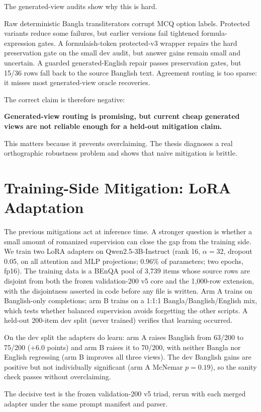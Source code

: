 The generated-view audits show why this is hard.

Raw deterministic Bangla transliterators corrupt MCQ option labels. Protected variants reduce some failures, but earlier versions fail tightened formula-expression gates. A formulaish-token protected-v3 wrapper repairs the hard preservation gate on the small dev audit, but answer gains remain small and uncertain. A guarded generated-English repair passes preservation gates, but 15/36 rows fall back to the source Banglish text. Agreement routing is too sparse: it misses most generated-view oracle recoveries.

The correct claim is therefore negative:

\textbf{Generated-view routing is promising, but current cheap generated views are not reliable enough for a held-out mitigation claim.}

This matters because it prevents overclaiming. The thesis diagnoses a real orthographic robustness problem and shows that naive mitigation is brittle.

\section{Training-Side Mitigation: LoRA Adaptation}

The previous mitigations act at inference time. A stronger question is whether a small amount of romanized supervision can close the gap from the training side. We train two LoRA adapters on Qwen2.5-3B-Instruct (rank 16, $\alpha=32$, dropout 0.05, on all attention and MLP projections; 0.96\% of parameters; two epochs, fp16). The training data is a BEnQA pool of 3{,}739 items whose source rows are disjoint from both the frozen validation-200 v5 core and the 1{,}000-row extension, with the disjointness asserted in code before any file is written. Arm A trains on Banglish-only completions; arm B trains on a 1:1:1 Bangla/Banglish/English mix, which tests whether balanced supervision avoids forgetting the other scripts. A held-out 200-item dev split (never trained) verifies that learning occurred.

On the dev split the adapters do learn: arm A raises Banglish from 63/200 to 75/200 ($+6.0$ points) and arm B raises it to 70/200, with neither Bangla nor English regressing (arm B improves all three views). The dev Banglish gains are positive but not individually significant (arm A McNemar $p = 0.19$), so the sanity check passes without overclaiming.

The decisive test is the frozen validation-200 v5 triad, rerun with each merged adapter under the same prompt manifest and parser.

